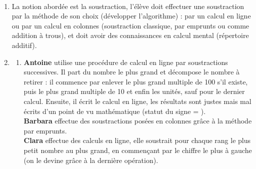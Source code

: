 \begin{corrige}
\ \\ [-5mm]
\begin{enumerate}
   \item La notion abordée est la soustraction, l'élève doit effectuer une soustraction par la méthode de son choix (développer l'algorithme) : par un calcul en ligne ou par un calcul en colonnes (soustraction classique, par emprunts ou comme addition à trous), et doit avoir des connaissances en calcul mental (répertoire additif).
   \item
      \begin{enumerate}
         \item {\bf Antoine} utilise une procédure de calcul en ligne par soustractions successives. Il part du nombre le plus grand et décompose le nombre à retirer : il commence par enlever le plus grand multiple de 100 s'il existe, puis le plus grand multiple de 10 et enfin les unités, sauf pour le dernier calcul. Ensuite, il écrit le calcul en ligne, les résultats sont justes mais mal écrits d'un point de vu mathématique (statut du signe \og = \fg).\\
         {\bf Barbara} effectue des soustractions posées en colonnes grâce à la méthode par emprunts. \\
         {\bf Clara} effectue des calculs en ligne, elle soustrait pour chaque rang le plus petit nombre au plus grand, en commençant par le chiffre le plus à gauche (on le devine grâce à la dernière opération).
      \end{enumerate}
\end{enumerate}

\Coupe


\end{corrige}
